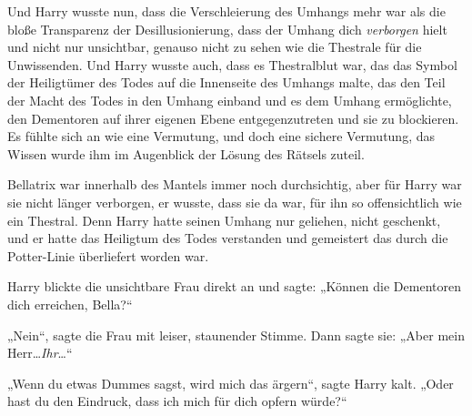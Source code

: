 Und Harry wusste nun, dass die Verschleierung des Umhangs mehr war als die bloße Transparenz der Desillusionierung, dass der Umhang dich \emph{verborgen} hielt und nicht nur unsichtbar, genauso nicht zu sehen wie die Thestrale für die Unwissenden. Und Harry wusste auch, dass es Thestralblut war, das das Symbol der Heiligtümer des Todes auf die Innenseite des Umhangs malte, das den Teil der Macht des Todes in den Umhang einband und es dem Umhang ermöglichte, den Dementoren auf ihrer eigenen Ebene entgegenzutreten und sie zu blockieren. Es fühlte sich an wie eine Vermutung, und doch eine sichere Vermutung, das Wissen wurde ihm im Augenblick der Lösung des Rätsels zuteil.

Bellatrix war innerhalb des Mantels immer noch durchsichtig, aber für Harry war sie nicht länger verborgen, er wusste, dass sie da war, für ihn so offensichtlich wie ein Thestral. Denn Harry hatte seinen Umhang nur geliehen, nicht geschenkt, und er hatte das Heiligtum des Todes verstanden und gemeistert das durch die Potter-Linie überliefert worden war.

Harry blickte die unsichtbare Frau direkt an und sagte: „Können die Dementoren dich erreichen, Bella?“

„Nein“, sagte die Frau mit leiser, staunender Stimme. Dann sagte sie: „Aber mein Herr…\emph{Ihr}…“

„Wenn du etwas Dummes sagst, wird mich das ärgern“, sagte Harry kalt. „Oder hast du den Eindruck, dass ich mich für dich opfern würde?“

